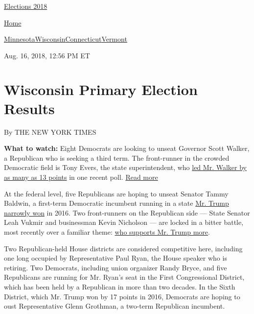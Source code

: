 \href{//www.nytimes3xbfgragh.onion}{}\href{https://www.nytimes3xbfgragh.onion/interactive/2018/us/elections/calendar-primary-results.html}{
Elections 2018}

\href{//www.nytimes3xbfgragh.onion}{ Home}

\href{https://www.nytimes3xbfgragh.onion/interactive/2018/08/14/us/elections/results-minnesota-primary-elections.html}{Minnesota}\href{https://www.nytimes3xbfgragh.onion/interactive/2018/08/14/us/elections/results-wisconsin-primary-elections.html}{Wisconsin}\href{https://www.nytimes3xbfgragh.onion/interactive/2018/08/14/us/elections/results-connecticut-primary-elections.html}{Connecticut}\href{https://www.nytimes3xbfgragh.onion/interactive/2018/08/14/us/elections/results-vermont-primary-elections.html}{Vermont}

Aug. 16, 2018, 12:56 PM ET

\hypertarget{wisconsin-primary-election-results}{%
\section{Wisconsin Primary Election
Results}\label{wisconsin-primary-election-results}}

By THE NEW YORK TIMES

\textbf{What to watch:} Eight Democrats are looking to unseat Governor
Scott Walker, a Republican who is seeking a third term. The front-runner
in the crowded Democratic field is Tony Evers, the state superintendent,
who
\href{https://www.nbcnews.com/politics/first-read/scott-walker-other-gop-candidates-key-midwest-states-trail-democratic-n895001}{led
Mr. Walker by as many as 13 points} in one recent poll.
\protect\hyperlink{}{Read more}

At the federal level, five Republicans are hoping to unseat Senator
Tammy Baldwin, a first-term Democratic incumbent running in a state
\href{https://www.nytimes3xbfgragh.onion/elections/results/president}{Mr.
Trump narrowly won} in 2016. Two front-runners on the Republican side
--- State Senator Leah Vukmir and businessman Kevin Nicholson --- are
locked in a bitter battle, most recently over a familiar theme:
\href{https://www.jsonline.com/story/news/politics/2018/08/07/leah-vukmir-blasts-kevin-nicholson-over-ad/918335002/}{who
supports Mr. Trump more}.

Two Republican-held House districts are considered competitive here,
including one long occupied by Representative Paul Ryan, the House
speaker who is retiring. Two Democrats, including union organizer Randy
Bryce, and five Republicans are running for Mr. Ryan's seat in the First
Congressional District, which has been held by a Republican in more than
two decades. In the Sixth District, which Mr. Trump won by 17 points in
2016, Democrats are hoping to oust Representative Glenn Grothman, a
two-term Republican incumbent.


